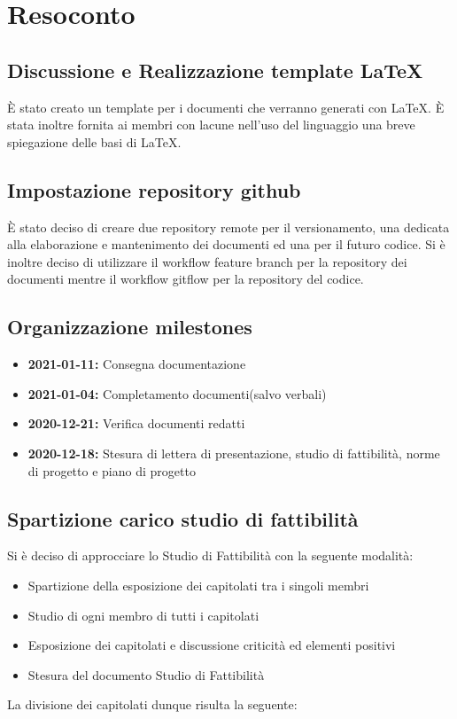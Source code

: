 \newpage


\section{Resoconto}

\subsection{Discussione e Realizzazione template LaTeX}

È stato creato un template per i documenti che verranno generati con \LaTeX. È stata inoltre fornita ai membri con lacune nell'uso del linguaggio una breve spiegazione delle basi di \LaTeX.

\subsection{Impostazione repository github}

È stato deciso di creare due repository remote per il versionamento, una dedicata alla elaborazione e mantenimento dei documenti ed una per il futuro codice. Si è inoltre deciso di utilizzare il workflow feature branch per la repository dei documenti mentre il workflow gitflow per la repository del codice.

\subsection{Organizzazione milestones}

\begin{itemize}

	\item \textbf{2021-01-11:} Consegna documentazione
	\item \textbf{2021-01-04:} Completamento documenti(salvo verbali)
	\item \textbf{2020-12-21:} Verifica documenti redatti
	\item \textbf{2020-12-18:} Stesura di lettera di presentazione, studio di fattibilità, norme di progetto e piano di progetto
	
\end{itemize}

\subsection{Spartizione carico studio di fattibilità}

Si è deciso di approcciare lo Studio di Fattibilità con la seguente modalità: 
\begin{itemize}
	\item Spartizione della esposizione dei capitolati tra i singoli membri	
	\item Studio di ogni membro di tutti i capitolati
	\item Esposizione dei capitolati e discussione criticità ed elementi positivi
	\item Stesura del documento Studio di Fattibilità
\end{itemize}
La divisione dei capitolati dunque risulta la seguente:

